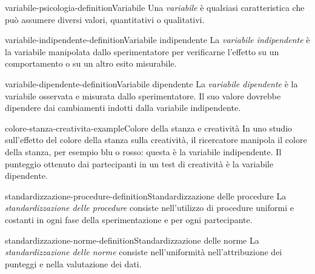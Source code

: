 \documentclass[preview]{standalone}
\begin{document}
\begin{snippetdefinition}{variabile-psicologia-definition}{Variabile}
    Una \emph{variabile} è qualsiasi caratteristica che può assumere diversi
    valori, quantitativi o qualitativi.
\end{snippetdefinition}

\begin{snippetdefinition}{variabile-indipendente-definition}{Variabile indipendente}
    La \emph{variabile indipendente} è la variabile manipolata dallo
    sperimentatore per verificarne l'effetto su un comportamento o su un altro
    esito misurabile.
\end{snippetdefinition}

\begin{snippetdefinition}{variabile-dipendente-definition}{Variabile dipendente}
    La \emph{variabile dipendente} è la variabile osservata e misurata dallo
    sperimentatore. Il suo valore dovrebbe dipendere dai cambiamenti indotti
    dalla variabile indipendente.
\end{snippetdefinition}

\begin{snippetexample}{colore-stanza-creativita-example}{Colore della stanza e creatività}
    In uno studio sull'effetto del colore della stanza sulla creatività, il
    ricercatore manipola il colore della stanza, per esempio blu o rosso:
    questa è la variabile indipendente. Il punteggio ottenuto dai partecipanti
    in un test di creatività è la variabile dipendente.
\end{snippetexample}


\begin{snippetdefinition}{standardizzazione-procedure-definition}{Standardizzazione delle procedure}
    La \emph{standardizzazione delle procedure} consiste nell'utilizzo di
    procedure uniformi e costanti in ogni fase della sperimentazione e per ogni
    partecipante.
\end{snippetdefinition}

\begin{snippetdefinition}{standardizzazione-norme-definition}{Standardizzazione delle norme}
    La \emph{standardizzazione delle norme} consiste nell'uniformità
    nell'attribuzione dei punteggi e nella valutazione dei dati.
\end{snippetdefinition}
\end{document}
